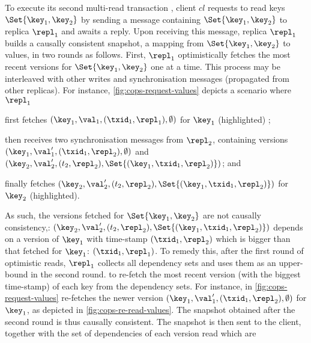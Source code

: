 To execute its second multi-read transaction ,
client  \( cl \) requests to read keys \( \Set{\key_1, \key_2} \) by sending a message containing 
\( \Set{\key_1, \key_2} \) to replica $\repl_1$ and awaits a reply.
Upon receiving this message, replica $\repl_1$ builds a causally consistent snapshot, \ie
a mapping from $\Set{\key_1, \key_2}$ to values, in two rounds as follows. 
First, $\repl_1$ optimistically fetches the most recent versions for \( \Set{\key_1,\key_2}\)
one at a time. 
This process may be interleaved with other writes and synchronisation messages (propagated from other replicas). 
For instance, \cref{fig:cops-request-values} depicts a scenario where \( \repl_1 \)
\begin{enumerate*}
	\item first fetches \( (\key_1,\val_1,(\txid_1,\repl_1), \emptyset) \) for $\key_1$ (highlighted) ; %
	\item then receives two synchronisation messages from \( \repl_2 \), 
containing versions \( ( \key_1, \val'_1, (\txid_1,\repl_2),\emptyset ) \) and \( ( \key_2, \val'_2, (t_2,\repl_2),\Set{(\key_1,\txid_1,\repl_2)} ) \); and
	\item finally fetches \( ( \key_2, \val'_2, (t_2,\repl_2),\Set{(\key_1,\txid_1,\repl_2)} ) \) for $\key_2$ (highlighted).
\end{enumerate*}
As such, the versions fetched for \( \Set{\key_1,\key_2}\) are not causally consistency,: 
\( ( \key_2, \val'_2, (t_2,\repl_2),\Set{(\key_1,\txid_1,\repl_2)} ) \) depends on a version of \( \key_1 \) with time-stamp $(\txid_1, \repl_2)$ which is bigger than that fetched for $\key_1$: $(\txid_1, \repl_1)$.
To remedy this, after the first round of optimistic reads,
$\repl_1$ collects all dependency sets and uses them as an upper-bound in the second round.
to re-fetch the most recent version (with the biggest time-stamp) of each key from the dependency sets.
For instance, in \cref{fig:cops-request-values} re-fetches the newer version \( ( \key_1, \val'_1, (\txid_1,\repl_2),\emptyset ) \) for \( \key_1 \), as depicted in \cref{fig:cops-re-read-values}.
The snapshot obtained after the second round is thus causally consistent. 
The snapshot is then sent to the client, together with the set of dependencies of each version read which are 
